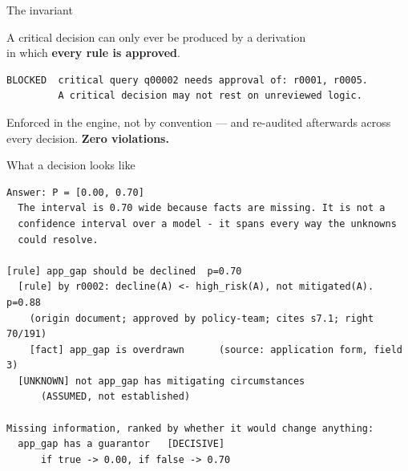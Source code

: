 \documentclass[aspectratio=169,11pt]{beamer}
\begin{document}
\begin{frame}[fragile]{The invariant}
  \vspace{1.2em}
  \begin{center}
    {\large A critical decision can only ever be produced by a derivation\\
     in which \textbf{\color{pine}every rule is approved}.}
  \end{center}
  \vspace{1.2em}
\begin{lstlisting}
BLOCKED  critical query q00002 needs approval of: r0001, r0005.
         A critical decision may not rest on unreviewed logic.
\end{lstlisting}
  \vspace{1em}
  \begin{center}\color{muted}
    Enforced in the engine, not by convention --- and re-audited afterwards
    across every decision. \textbf{Zero violations.}
  \end{center}
\end{frame}

\begin{frame}[fragile]{What a decision looks like}
  \vspace{.2em}
\begin{lstlisting}
Answer: P = [0.00, 0.70]
  The interval is 0.70 wide because facts are missing. It is not a
  confidence interval over a model - it spans every way the unknowns
  could resolve.

[rule] app_gap should be declined  p=0.70
  [rule] by r0002: decline(A) <- high_risk(A), not mitigated(A). p=0.88
    (origin document; approved by policy-team; cites s7.1; right 70/191)
    [fact] app_gap is overdrawn      (source: application form, field 3)
  [UNKNOWN] not app_gap has mitigating circumstances
      (ASSUMED, not established)

Missing information, ranked by whether it would change anything:
  app_gap has a guarantor   [DECISIVE]
      if true -> 0.00, if false -> 0.70
\end{lstlisting}
\end{frame}
\end{document}

